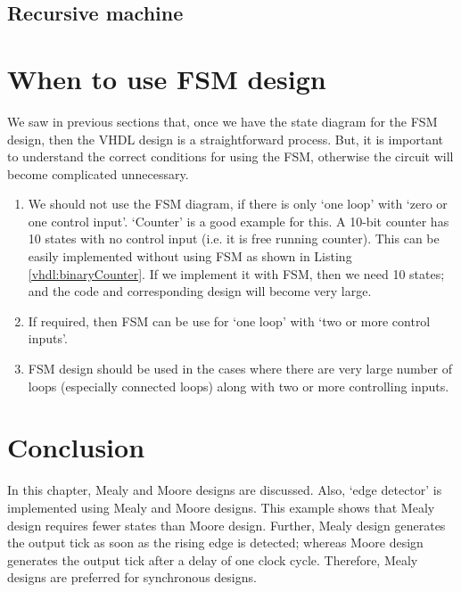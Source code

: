 \subsection{Recursive machine}


\section{When to use FSM design}
We saw in previous sections that, once we have the state diagram for the FSM design, then the VHDL design is a straightforward process. But, it is important to understand the correct conditions for using the FSM, otherwise the circuit will become complicated unnecessary. 

\begin{enumerate}
	\item We should not use the FSM diagram, if there is only `one loop' with `zero or one control input'. `Counter' is a good example for this. A 10-bit counter has 10 states with no control input (i.e. it is free running counter). This can be easily implemented without using FSM as shown in Listing \ref{vhdl:binaryCounter}. If we implement it with FSM, then we need 10 states; and the code and corresponding design will become very large. 
	
	\item If required, then FSM can be use for `one loop' with `two or more control inputs'. 
	
	\item FSM design should be used in the cases where there are very large number of loops (especially connected loops) along with two or more controlling inputs. 
	
\end{enumerate}
\section{Conclusion}
In this chapter, Mealy and Moore designs are discussed. Also, `edge detector' is implemented using Mealy and Moore designs. This example shows that Mealy design requires fewer states than Moore design. Further, Mealy design generates the output tick as soon as the rising edge is detected; whereas Moore design generates the output tick after a delay of one clock cycle. Therefore, Mealy designs are preferred for synchronous designs. 